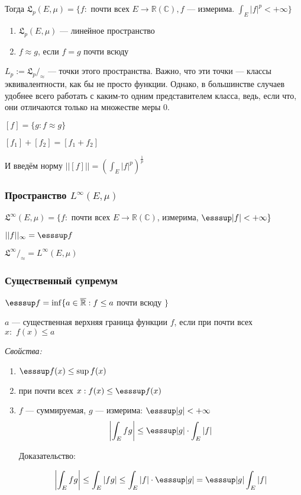 \documentclass{article}
\def\dbl{\,\,}
\def\rinf{\overline{\mathbb{R}}}
\begin{document}
Тогда $\mathfrak{L}_p(E, \mu) = \{f:$ почти всех $E \rightarrow \mathbb{R} (\mathbb{C}), f$ --- измерима. $\int_{E} |f|^{p} < + \infty\}$

\begin{enumerate}
    \item $\mathfrak{L}_p(E, \mu)$ --- линейное пространство
    \item $f \approx g$, если $f = g$ почти всюду
\end{enumerate}

$L_p := \mathfrak{L}_p /_{\approx}$ --- точки этого пространства. Важно, что эти точки --- классы эквивалентности, как бы не просто функции. Однако, в большинстве случаев удобнее всего работать с каким-то одним представителем класса, ведь, если что, они отличаются только на множестве меры 0.

$[f] = \{g: f \approx g\}$

$[f_1] + [f_2] = [f_1 + f_2]$

И введём норму $||[f]|| = \left(\int_{E} |f|^{p}\right)^{\frac{1}{p}}$

\subsubsection{Пространство $L^\infty(E,\mu)$}

$\mathfrak{L}^{\infty}(E, \mu) = \{f: $ почти всех $E \rightarrow \mathbb{R} (\mathbb{C})$, измерима, $\esssup |f| < + \infty\}$

$||f||_{\infty} = \esssup f$

$\mathfrak{L}^{\infty} /_\approx = L^{\infty}(E, \mu)$

\subsubsection{Существенный супремум}

$\esssup f = \inf \{a \in \rinf: f \le a $ почти всюду $\}$

$a$ --- существенная верхняя граница функции $f$, если при почти всех $x: \dbl f(x) \le a$

\textit{Свойства: }
\begin{enumerate}
    \item $\esssup f(x) \le \sup f(x)$
    \item при почти всех $x: f(x) \le \esssup f(x)$
    \item $f$ --- суммируемая, $g$ --- измерима: $\esssup |g| < + \infty$
    \[\left|\int_{E} fg\right| \le \esssup |g| \cdot \int_{E} |f|\]

    Доказательство:

    \[\left|\int_{E} fg\right| \le \int_{E} |fg| \le \int_{E} |f| \cdot \esssup |g| = \esssup |g| \int_{E} |f|\]
\end{enumerate}
\end{document}
